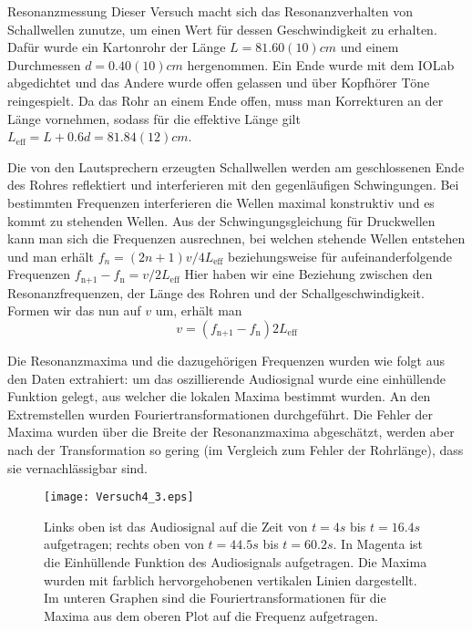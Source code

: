 \documentclass{alex_gp}
\begin{document}
\begin{mybox}{Resonanzmessung}
	Dieser Versuch macht sich das Resonanzverhalten von Schallwellen zunutze, um einen Wert für dessen Geschwindigkeit zu erhalten.
	Dafür wurde ein Kartonrohr der Länge \newline\( L = 81.60(10) \unit{cm} \) und einem Durchmessen \( d = 0.40(10) \unit{cm} \) hergenommen. Ein Ende wurde mit dem IOLab abgedichtet und das Andere wurde offen gelassen und über Kopfhörer Töne reingespielt. Da das Rohr an einem Ende offen, muss man Korrekturen an der Länge vornehmen, sodass für die effektive Länge gilt \( L_{\text{eff}} = L + 0.6d = 81.84(12) \unit{cm} \).
	
	Die von den Lautsprechern erzeugten Schallwellen werden am geschlossenen Ende des Rohres reflektiert und interferieren mit den gegenläufigen Schwingungen. Bei bestimmten Frequenzen interferieren die Wellen maximal konstruktiv und es kommt zu stehenden Wellen. Aus der Schwingungsgleichung für Druckwellen kann man sich die Frequenzen ausrechnen, bei welchen stehende Wellen entstehen und man erhält \( f_n = (2n+1)v/4L_{\text{eff}} \) beziehungsweise für aufeinanderfolgende Frequenzen \( f_{\text{n+1}} - f_{\text{n}} = v/2L_{\text{eff}} \)
	Hier haben wir eine Beziehung zwischen den Resonanzfrequenzen, der Länge des Rohren und der Schallgeschwindigkeit. Formen wir das nun auf \( v \) um, erhält man
	\begin{equation}\label{eqn:cfn}
		v = \left(f_{\text{n+1}} - f_{\text{n}}\right) 2L_{\text{eff}}
	\end{equation}

	Die Resonanzmaxima und die dazugehörigen Frequenzen wurden wie folgt aus den Daten extrahiert: um das oszillierende Audiosignal wurde eine einhüllende Funktion gelegt, aus welcher die lokalen Maxima bestimmt wurden. An den Extremstellen wurden Fouriertransformationen durchgeführt. Die Fehler der Maxima wurden über die Breite der Resonanzmaxima abgeschätzt, werden aber nach der Transformation so gering (im Vergleich zum Fehler der Rohrlänge), dass sie vernachlässigbar sind. 
	
	\begin{figure}[H]	
		\centering
		\texttt{[image: Versuch4\_3.eps]}
		\caption{Links oben ist das Audiosignal auf die Zeit von \( t = 4 \unit{s} \) bis \( t = 16.4 \unit{s} \) aufgetragen; rechts oben von \( t = 44.5 \unit{s} \) bis \( t = 60.2 \unit{s} \). In Magenta ist die Einhüllende Funktion des Audiosignals aufgetragen. Die Maxima wurden mit farblich hervorgehobenen vertikalen Linien dargestellt. Im unteren Graphen sind die Fouriertransformationen für die Maxima aus dem oberen Plot auf die Frequenz aufgetragen.}
		\label{fig:fft}
	\end{figure}
	

\end{mybox}
\end{document}
